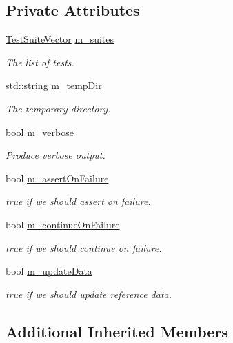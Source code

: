 \subsection*{Private Attributes}
\begin{DoxyCompactItemize}
\item 
\hyperlink{classns3_1_1TestRunnerImpl_a80833d3e74ea02fb09c79fa26935b5b7}{Test\+Suite\+Vector} \hyperlink{classns3_1_1TestRunnerImpl_ad9c1c25956dd113f924cfcdad60f236c}{m\+\_\+suites}
\begin{DoxyCompactList}\small\item\em The list of tests. \end{DoxyCompactList}\item 
std\+::string \hyperlink{classns3_1_1TestRunnerImpl_a659f2ebce866a2fc11e8dfee14b8b802}{m\+\_\+temp\+Dir}
\begin{DoxyCompactList}\small\item\em The temporary directory. \end{DoxyCompactList}\item 
bool \hyperlink{classns3_1_1TestRunnerImpl_ad9188e308ca5a1822ca9c49dd5f9b510}{m\+\_\+verbose}
\begin{DoxyCompactList}\small\item\em Produce verbose output. \end{DoxyCompactList}\item 
bool \hyperlink{classns3_1_1TestRunnerImpl_a0dad11e28c0c9dfd308fabeb297762ec}{m\+\_\+assert\+On\+Failure}
\begin{DoxyCompactList}\small\item\em {\ttfamily true} if we should assert on failure. \end{DoxyCompactList}\item 
bool \hyperlink{classns3_1_1TestRunnerImpl_a4302ab85e8be3b0d88b240b556248daf}{m\+\_\+continue\+On\+Failure}
\begin{DoxyCompactList}\small\item\em {\ttfamily true} if we should continue on failure. \end{DoxyCompactList}\item 
bool \hyperlink{classns3_1_1TestRunnerImpl_a5751d5379b5bde6b54cfb68151ddf8b3}{m\+\_\+update\+Data}
\begin{DoxyCompactList}\small\item\em {\ttfamily true} if we should update reference data. \end{DoxyCompactList}\end{DoxyCompactItemize}
\subsection*{Additional Inherited Members}


